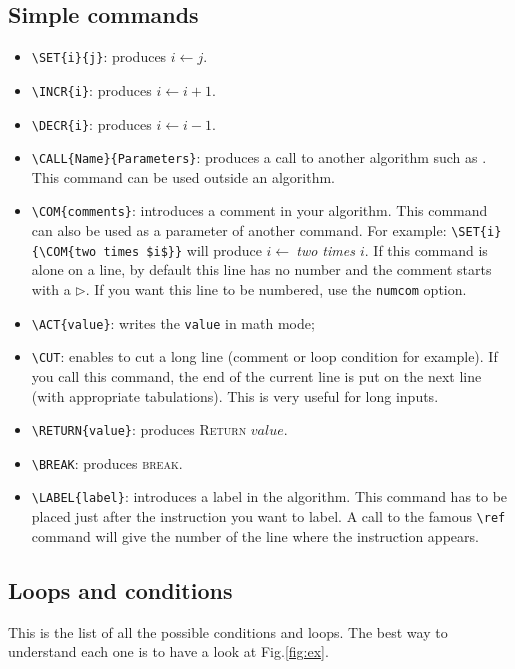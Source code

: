 \documentclass{article}
\begin{document}
\subsection{Simple commands}
\begin{itemize}
\item 
	\verb!\SET{i}{j}!: produces $i\leftarrow j$.
\item 
	\verb!\INCR{i}!: produces $i\leftarrow i+1$.
\item 
	\verb!\DECR{i}!: produces $i\leftarrow i-1$.
\item 
	\verb!\CALL{Name}{Parameters}!: produces a call to another algorithm such as . This command can be used outside an 
	algorithm.
\item 
	\verb!\COM{comments}!: introduces a comment in your algorithm. This 
			command can also be used as a parameter of another 
			command. For example: \verb!\SET{i}{\COM{two times $i$}}! will produce $i\leftarrow~$\textit{two times $i$}. If this command is alone on a line, by default this line has no number and the comment starts with a $\triangleright$. If you want this line to be numbered, use the \verb!numcom! option.
\item
	\verb!\ACT{value}!: writes the \verb!value! in math mode;
\item
	\verb!\CUT!: enables to cut a long line (comment or loop condition for
		example). If you call this command, the end of the current 
		line is put on the next line (with appropriate tabulations). 
		This is very useful for long inputs.  
\item 
	\verb!\RETURN{value}!: produces \textsc{Return} $value$.
\item 
	\verb!\BREAK!: produces \textsc{break}.
\item
	\verb!\LABEL{label}!: introduces a label in the algorithm. This command has to be placed just after the instruction you want to label. A call to the famous \verb!\ref! command will give the number of the line where the instruction appears.
\end{itemize}

\subsection{Loops and conditions}

This is the list of all the possible conditions and loops.
The best way to understand each one is to have a look at Fig.\ref{fig:ex}.  
\end{document}
